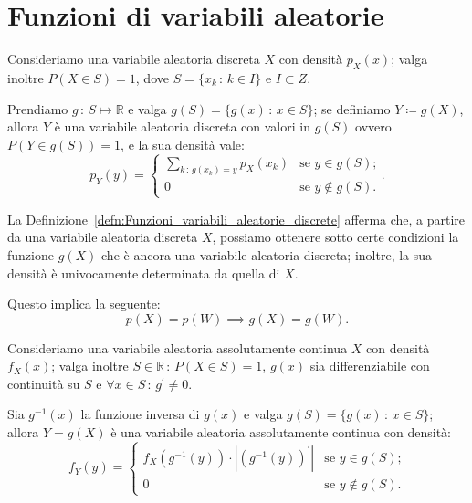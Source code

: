     \section{Funzioni di variabili aleatorie}\label{sec:Funzioni_variabili_aleatorie}
        \begin{defn}[discreta]\label{defn:Funzioni_variabili_aleatorie_discrete}
            Consideriamo una variabile aleatoria discreta $X$ con densità $p_X(x)$; valga inoltre $P(X \in S) = 1$, dove $S = \{x_k \,:\, k \in I\}$ e $I \subset Z$.

            Prendiamo $g\,:\, S \mapsto \mathbb{R}$ e valga $g(S) = \{g(x) \,:\, x \in S\}$; se definiamo $Y \coloneqq g(X)$, allora $Y$ è una variabile aleatoria discreta con valori in $g(S)$ ovvero $P(Y \in g(S)) = 1$, e la sua densità vale: \[
                p_Y(y) = \begin{cases}
                    \sum_{k \,:\, g(x_k) =y} p_X(x_k) & \text{se $y \in g(S)$;} \\
                    0 & \text{se $y \notin g(S)$.}
                \end{cases}
            .\]
        \end{defn}
        \begin{obsv}
            La Definizione~\ref{defn:Funzioni_variabili_aleatorie_discrete} afferma che, a partire da una variabile aleatoria discreta $X$, possiamo ottenere sotto certe condizioni la funzione $g(X)$ che è ancora una variabile aleatoria discreta; inoltre, la sua densità è univocamente determinata da quella di $X$.

            Questo implica la seguente: \[
                p(X) = p(W) \implies g(X) = g(W)
            .\] 
        \end{obsv}
        \begin{defn}[continua]\label{defn:Funzioni_variabili_aleatorie_continue}
            Consideriamo una variabile aleatoria assolutamente continua $X$ con densità $f_X(x)$; valga inoltre $S \in \mathbb{R} \,:\, P(X \in S) = 1$, $g(x)$ sia differenziabile con continuità su $S$ e $\forall x \in S \,:\, g^{\prime} \neq 0$.

            Sia $g^{-1}(x)$ la funzione inversa di $g(x)$ e valga $g(S) = \{g(x) \,:\, x \in S\}$; allora $Y = g(X)$ è una variabile aleatoria assolutamente continua con densità: \[
                f_Y(y) = \begin{cases}
                    f_X(g^{-1}(y)) \cdot \left|(g^{-1}(y))^{\prime}\right| & \text{se $y \in g(S)$;} \\
                    0 & \text{se $y \notin g(S)$.}
                \end{cases}
            \]
        \end{defn}
